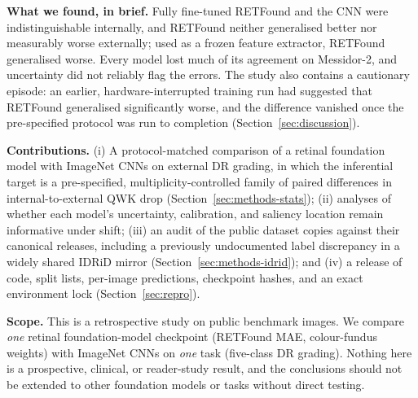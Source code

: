 \documentclass[journal]{IEEEtran}
\renewcommand{\_}{\origunderscore\allowbreak}
\begin{document}
\textbf{What we found, in brief.} Fully fine-tuned RETFound and the CNN were
indistinguishable internally, and RETFound neither generalised better nor
measurably worse externally; used as a frozen feature extractor, RETFound
generalised worse. Every model lost much of its agreement on Messidor-2, and
uncertainty did not reliably flag the errors. The study also contains a
cautionary episode: an earlier, hardware-interrupted training run had suggested
that RETFound generalised significantly worse, and the difference vanished once
the pre-specified protocol was run to completion (Section~\ref{sec:discussion}).

\textbf{Contributions.} (i) A protocol-matched comparison of a retinal foundation
model with ImageNet CNNs on external DR grading, in which the inferential target
is a pre-specified, multiplicity-controlled family of paired differences in
internal-to-external QWK drop (Section~\ref{sec:methods-stats}); (ii) analyses of
whether each model's uncertainty, calibration, and saliency location remain
informative under shift; (iii) an audit of the public dataset copies against
their canonical releases, including a previously undocumented label discrepancy in
a widely shared IDRiD mirror (Section~\ref{sec:methods-idrid}); and (iv) a
release of code, split lists, per-image predictions, checkpoint hashes, and an
exact environment lock (Section~\ref{sec:repro}).

\textbf{Scope.} This is a retrospective study on public benchmark images. We
compare \emph{one} retinal foundation-model checkpoint (RETFound MAE,
colour-fundus weights) with ImageNet CNNs on \emph{one} task (five-class DR
grading). Nothing here is a prospective, clinical, or reader-study result, and
the conclusions should not be extended to other foundation models or tasks
without direct testing.
\end{document}
